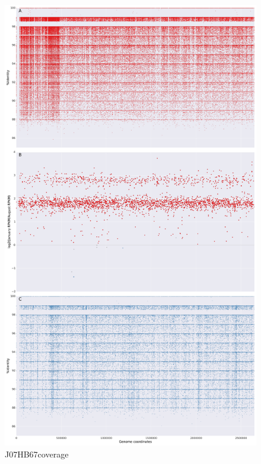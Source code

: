 \begin{figure}[!hbtp]
  \centering
  \includegraphics[width=\textwidth,height=\textheight,keepaspectratio]{Chapter5/Figures/coverage_plots/J07HB67_coverage.pdf}
  \caption{J07HB67coverage}
  \label{J07HB67coverage}
\end{figure}

